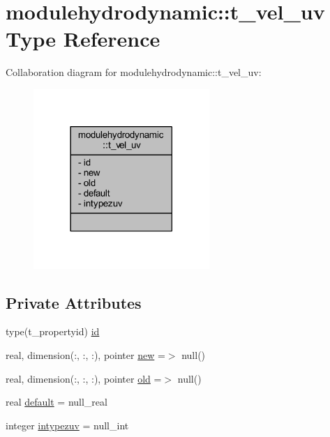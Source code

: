 \hypertarget{structmodulehydrodynamic_1_1t__vel__uv}{}\section{modulehydrodynamic\+:\+:t\+\_\+vel\+\_\+uv Type Reference}
\label{structmodulehydrodynamic_1_1t__vel__uv}


Collaboration diagram for modulehydrodynamic\+:\+:t\+\_\+vel\+\_\+uv\+:\nopagebreak
\begin{figure}[H]
\begin{center}
\leavevmode
\includegraphics[width=189pt]{structmodulehydrodynamic_1_1t__vel__uv__coll__graph}
\end{center}
\end{figure}
\subsection*{Private Attributes}
\begin{DoxyCompactItemize}
\item 
type(t\+\_\+propertyid) \mbox{\hyperlink{structmodulehydrodynamic_1_1t__vel__uv_adf5eeeda924e0911c0c5ba024861a0d6}{id}}
\item 
real, dimension(\+:, \+:, \+:), pointer \mbox{\hyperlink{structmodulehydrodynamic_1_1t__vel__uv_a6bb9fcbf5b36a683dc10efa6def7653b}{new}} =$>$ null()
\item 
real, dimension(\+:, \+:, \+:), pointer \mbox{\hyperlink{structmodulehydrodynamic_1_1t__vel__uv_a710cad52cdac9a7185ee3ef1ba7d5290}{old}} =$>$ null()
\item 
real \mbox{\hyperlink{structmodulehydrodynamic_1_1t__vel__uv_ae0fca8fdacede056b110da828c3fa0fb}{default}} = null\+\_\+real
\item 
integer \mbox{\hyperlink{structmodulehydrodynamic_1_1t__vel__uv_ae80999a8bb70644a27bc46bd883439ea}{intypezuv}} = null\+\_\+int
\end{DoxyCompactItemize}


